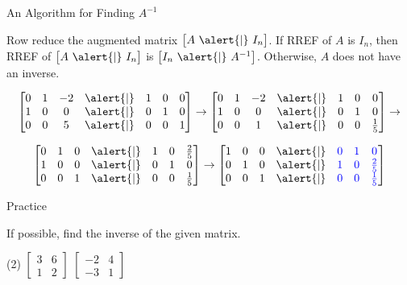\documentclass[xcolor=dvipsnames,aspectratio=169,t]{beamer}
\begin{document}
\begin{frame}{An Algorithm for Finding $A^{-1}$}

Row reduce the augmented matrix $\begin{bmatrix} A \ \alert{|} \ I_n \end{bmatrix}$.
\bi
\ii  If RREF of $A$ is $I_n$, then RREF of $\begin{bmatrix} A \ \alert{|} \  I_n \end{bmatrix}$ is  $\begin{bmatrix} I_n \ \alert{|} \  A^{-1} \end{bmatrix}$.
\ii Otherwise, $A$ does not have an inverse.
\ei

\[ \begin{bmatrix} 
0 & 1 & -2 & \alert{|} & 1 & 0 & 0 \\ 
1 & 0 & 0 & \alert{|} & 0 & 1 & 0 \\ 
0 & 0 & 5 & \alert{|} & 0 & 0 & 1 \end{bmatrix} \rightarrow \begin{bmatrix} 
0 & 1 & -2 & \alert{|} & 1 & 0 & 0 \\ 
1 & 0 & 0 & \alert{|} & 0 & 1 & 0 \\ 
0 & 0 & 1 & \alert{|} & 0 & 0 & \frac{1}{5} \end{bmatrix} \rightarrow  \]

\[ \begin{bmatrix} 
0 & 1 & 0 & \alert{|} & 1 & 0 & \frac{2}{5} \\ 
1 & 0 & 0 & \alert{|} & 0 & 1 & 0 \\ 
0 & 0 & 1 & \alert{|} & 0 & 0 & \frac{1}{5} \end{bmatrix} \rightarrow  \begin{bmatrix} 
1 & 0 & 0 & \alert{|} & \colorb{0} & \colorb{1} & \colorb{0} \\ 
0 & 1 & 0 & \alert{|} & \colorb{1} & \colorb{0} & \colorb{\frac{2}{5}} \\ 
0 & 0 & 1 & \alert{|} & \colorb{0} & \colorb{0} & \colorb{\frac{1}{5}} \end{bmatrix} 
 \]

\end{frame}

\begin{frame}{Practice}

  If possible, find the inverse of the given matrix.

  \begin{tasks}(2)
    \task $\begin{bmatrix} 3 & 6 \\ 1 & 2 \end{bmatrix}$
    \task $\begin{bmatrix} -2 & 4 \\ -3 & 1 \end{bmatrix}$
  \end{tasks}

\end{frame}
\end{document}
